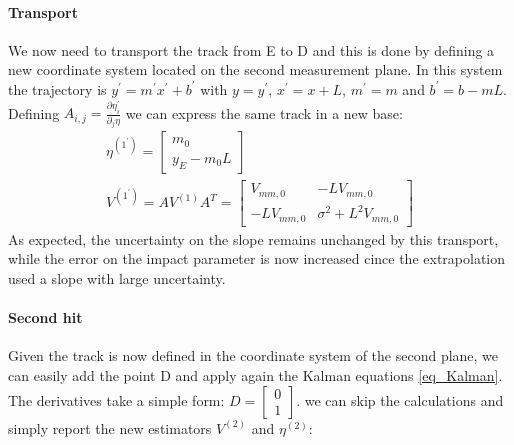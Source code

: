 \documentclass[12pt,a4paper,openright, oneside, titlepage]{book} %
\begin{document}
\paragraph{Transport} 
We now need to transport the track from E to D and this is done by defining a new coordinate system located on the second measurement plane. 
In this system the trajectory is $y^\prime=m^\prime x^\prime+b^\prime$ with $y=y^\prime$, $x^\prime=x+L$, $m^\prime=m$ and $b^\prime=b-mL$. Defining $A_{i,j}=\frac{\partial \eta_i^\prime}{\partial_j\eta}$ we can express the same track in a new base:
\begin{gather*}
\eta^{(1^\prime)}=\begin{bmatrix} m_0 \\ y_E - m_0L \end{bmatrix} \\
V^{(1^\prime)} = AV^{(1)} A^T= \begin{bmatrix}
V_{mm,0} & -LV_{mm,0} \\ -LV_{mm,0} & \sigma^2 +L^2V_{mm,0}
\end{bmatrix}
\end{gather*}
As expected, the uncertainty on the slope remains unchanged by this transport, 
while the error on the impact parameter is now increased cince the extrapolation used a slope with large uncertainty.

\paragraph{Second hit} 
Given the track is now defined in the coordinate system of the second plane, 
we can easily add the point D and apply again the Kalman equations \ref{eq_Kalman}. 
The derivatives take a simple form: $D=\begin{bmatrix}0\\1\end{bmatrix}$. 
we can skip the calculations and simply report the new estimators  $V^{(2)}$ and $\eta^{(2)}$:
\end{document}
